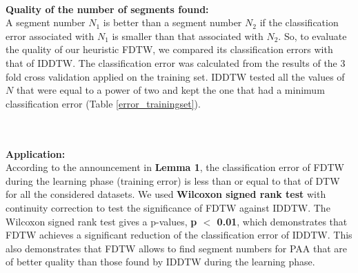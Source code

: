  \paragraph{}\textbf{Quality of the number of segments found:}   \\
 A segment number $N_1$ is better than a segment number $N_2$ if the classification
 error associated with $N_1$ is smaller than that associated with $N_2$. So, to evaluate the
 quality of our heuristic FDTW, we compared its classification errors with that of IDDTW.
  The classification error  was calculated from the results of the 3 fold cross validation 
  applied on the training set. IDDTW tested all the values of $N$ that were equal to a power of two and kept the one that had  a minimum
classification error (Table \ref{error_trainingset}).


\\
 \paragraph{}\textbf{Application:}  \\
According to the announcement in \textbf{Lemma 1}, the classification error of FDTW during the learning phase (training error) is less
than or equal to that of DTW for all the considered datasets.  We used \textbf{Wilcoxon signed rank test} with continuity
correction to test the significance of FDTW against IDDTW.  The Wilcoxon signed rank test gives a
p-values, \textbf{ p $<$ 0.01}, which demonstrates that FDTW achieves a
significant reduction of the classification error of IDDTW. This also demonstrates that FDTW allows
to find segment numbers for PAA that are of better quality than those found by IDDTW during the learning phase.

